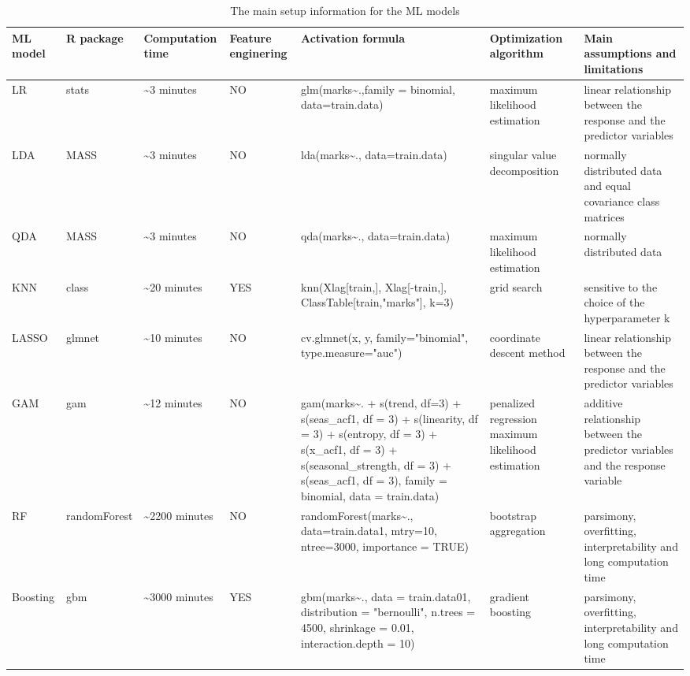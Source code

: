 \documentclass[preprint, 3p,
authoryear]{elsarticle} %
\begin{document}
\begin{table}[!h]

\caption{\label{tab:modelSetup}The main setup information for the ML models}
\centering
\fontsize{11}{13}\selectfont
\begin{tabular}[t]{lllllll}
\toprule
ML model & R package & Computation time & Feature enginering & Activation formula & Optimization algorithm & Main assumptions and limitations\\
\midrule
LR & stats & \textasciitilde{}3 minutes & NO & glm(marks\textasciitilde{}.,family = binomial, data=train.data) & maximum likelihood estimation & linear relationship between the response and the predictor variables\\
LDA & MASS & \textasciitilde{}3 minutes & NO & lda(marks\textasciitilde{}., data=train.data) & singular value decomposition & normally distributed data and equal covariance class matrices\\
QDA & MASS & \textasciitilde{}3 minutes & NO & qda(marks\textasciitilde{}., data=train.data) & maximum likelihood estimation & normally distributed data\\
KNN & class & \textasciitilde{}20 minutes & YES & knn(Xlag[train,], Xlag[-train,], ClassTable[train,"marks"], k=3) & grid search & sensitive to the choice of the hyperparameter k\\
LASSO & glmnet & \textasciitilde{}10 minutes & NO & cv.glmnet(x, y, family="binomial", type.measure="auc") & coordinate descent method & linear relationship between the response and the predictor variables\\
GAM & gam & \textasciitilde{}12 minutes & NO & gam(marks\textasciitilde{}. + s(trend, df=3) + s(seas\_acf1, df = 3) + s(linearity, df = 3) + s(entropy, df = 3) + s(x\_acf1, df = 3) + s(seasonal\_strength, df = 3) + s(seas\_acf1, df = 3), family = binomial, data = train.data) & penalized regression maximum likelihood estimation & additive relationship between the predictor variables and the response variable\\
RF & randomForest & \textasciitilde{}2200 minutes & NO & randomForest(marks\textasciitilde{}., data=train.data1, mtry=10, ntree=3000, importance = TRUE) & bootstrap aggregation & parsimony, overfitting, interpretability and long computation time\\
Boosting & gbm & \textasciitilde{}3000 minutes & YES & gbm(marks\textasciitilde{}., data = train.data01, distribution = "bernoulli", n.trees = 4500, shrinkage = 0.01, interaction.depth = 10) & gradient boosting & parsimony, overfitting, interpretability and long computation time\\

\end{tabular}
\end{table}
\end{document}

